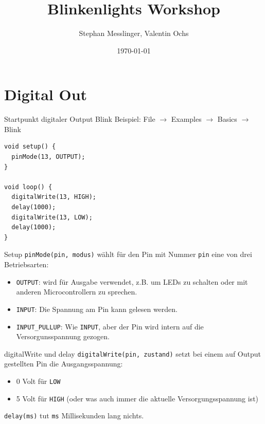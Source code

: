 \documentclass[bigger]{beamer}
\author{Stephan Messlinger, Valentin Ochs}
\date{\today}
\title{Blinkenlights Workshop}
\begin{document}
\maketitle

\section{Digital Out}
\label{sec:orga8909c0}
\begin{frame}[fragile,label={sec:orga9dcb9a}]{Startpunkt digitaler Output}
 Blink Beispiel: File \(\rightarrow\) Examples \(\rightarrow\) Basics \(\rightarrow\) Blink

\begin{verbatim}
void setup() {
  pinMode(13, OUTPUT);
}

void loop() {
  digitalWrite(13, HIGH);
  delay(1000);
  digitalWrite(13, LOW);
  delay(1000);
}
\end{verbatim}
\end{frame}

\begin{frame}[fragile,label={sec:org5978ddd}]{Setup}
 \texttt{pinMode(pin, modus)} wählt für den Pin mit Nummer \texttt{pin} eine von drei
Betriebsarten:

\begin{itemize}
\item \texttt{OUTPUT}: wird für Ausgabe verwendet, z.B. um LEDs zu schalten oder
mit anderen Microcontrollern zu sprechen.
\item \texttt{INPUT}: Die Spannung am Pin kann gelesen werden.
\item \texttt{INPUT\_PULLUP}: Wie \texttt{INPUT}, aber der Pin wird intern auf die
Versorgunsspannung gezogen.
\end{itemize}
\end{frame}

\begin{frame}[fragile,label={sec:org8e19988}]{digitalWrite und delay}
 \texttt{digitalWrite(pin, zustand)} setzt bei einem auf Output gestellten Pin
die Ausgangsspannung:

\begin{itemize}
\item 0 Volt für \texttt{LOW}
\item 5 Volt für \texttt{HIGH} (oder was auch immer die aktuelle
Versorgungsspannung ist)
\end{itemize}

\texttt{delay(ms)} tut \texttt{ms} Millisekunden lang nichts.
\end{frame}
\end{document}
